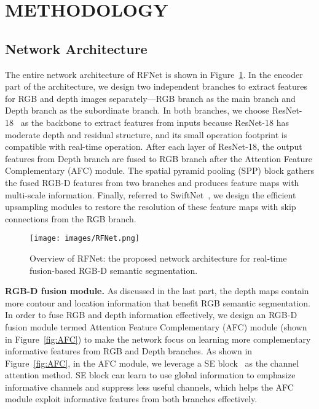 \documentclass[letterpaper, 10 pt, journal, twoside]{ieeetran}
\begin{document}
\section{METHODOLOGY}

\subsection{Network Architecture}
The entire network architecture of RFNet is shown in Figure~\ref{fig:RFNet}.
In the encoder part of the architecture, we design two independent branches to extract features for RGB and depth images separately—RGB branch as the main branch and Depth branch as the subordinate branch. In both branches, we choose ResNet-18~\cite{he2016identity} as the backbone to extract features from inputs because ResNet-18 has moderate depth and residual structure, and its small operation footprint is compatible with real-time operation. After each layer of ResNet-18, the output features from Depth branch are fused to RGB branch after the Attention Feature Complementary (AFC) module. The spatial pyramid pooling (SPP) block gathers the fused RGB-D features from two branches and produces feature maps with multi-scale information. Finally, referred to SwiftNet~\cite{orsic2019defense}, we design the efficient upsampling modules to restore the resolution of these feature maps with skip connections from the RGB branch.


\begin{figure}[t]
    \centerline{\texttt{[image: images/RFNet.png]}}
    \caption{Overview of RFNet: the proposed network architecture for real-time fusion-based RGB-D semantic segmentation.}
    \label{fig:RFNet}
\end{figure}

\textbf{RGB-D fusion module.}
As discussed in the last part, the depth maps contain more contour and location information that benefit RGB semantic segmentation. In order to fuse RGB and depth information effectively, we design an RGB-D fusion module termed Attention Feature Complementary (AFC) module (shown in Figure~\ref{fig:AFC}) to make the network focus on learning more complementary informative features from RGB and Depth branches. As shown in Figure~\ref{fig:AFC}, in the AFC module, we leverage a SE block~\cite{hu2018squeeze} as the channel attention method. SE block can learn to use global information to emphasize informative channels and suppress less useful channels, which helps the AFC module exploit informative features from both branches effectively. 
\end{document}
